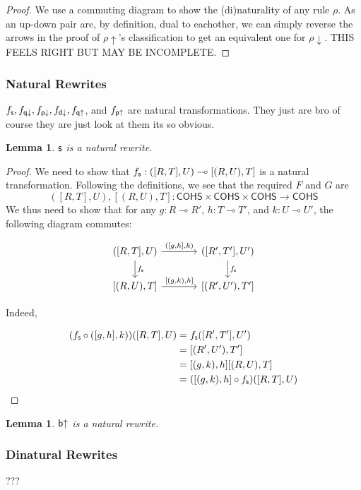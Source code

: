 \documentclass[11pt, oneside]{article}
\theoremstyle{plain}
\newtheorem{lemma}[theorem]{Lemma}
\theoremstyle{definition}
\newcommand{\cohs}{{\mathsf{COHS}}}
\newcommand{\comp}{\mathbin{\circ}}
\begin{document}
\begin{proof}
We use a commuting diagram to show the (di)naturality of any rule $\rho$.
As an up-down pair are, by definition, dual to eachother, we can simply reverse the arrows in the proof of ${\mathsf{\rho}}{\uparrow}$'s classification to get an equivalent one for ${\mathsf{\rho}}{\downarrow}$.
THIS FEELS RIGHT BUT MAY BE INCOMPLETE.
\end{proof}

\subsubsection{Natural Rewrites}
$f_{{\mathsf s}},f_{{\mathsf q}{\downarrow}},f_{{\mathsf p}{\downarrow}},f_{{\mathsf d}{\downarrow}},f_{{\mathsf q}{ \uparrow}}$, and $f_{{\mathsf p}{ \uparrow}}$ are natural transformations.
They just are bro of course they are just look at them its so obvious.

\begin{lemma}
${\mathsf s}$ is a natural rewrite.
\end{lemma}

\begin{proof}
We need to show that $f_{{\mathsf s}}:([R,T],U)\multimap[(R,U),T]$ is a natural transformation.
Following the definitions, we see that the required $F$ and $G$ are
$$([R,T],U),[(R,U),T]:\cohs\times\cohs\times\cohs\to\cohs$$
We thus need to show that for any $g:R\multimap R'$, $h:T\multimap T'$, and $k:U\multimap U'$, the following diagram commutes:

\[
\begin{tikzcd}[column sep = large]
    ([R,T],U) \arrow[r,"{([g,h],k)}"]\arrow[d,"f_{\sw}"]& ([R',T'],U') \arrow[d,"f_{\sw}"] \\
    {[(R,U),T]} \arrow[r,"{[(g,k),h]}"] & {[(R',U'),T']}
\end{tikzcd}
\]

Indeed,

\begin{align*}
(f_{\sw}\comp ([g,h],k))([R,T],U) &= f_{\sw}([R',T'],U') \\
&= [(R',U'),T'] \\
&= [(g,k),h][(R,U),T] \\
&= ([(g,k),h]\comp f_{\sw})([R,T],U)
\end{align*}
\end{proof}

\begin{lemma}
${\mathsf b}{ \uparrow}$ is a natural rewrite.
\end{lemma}

\subsubsection{Dinatural Rewrites}
???
\end{document}
